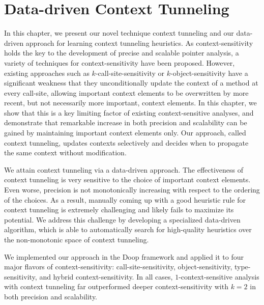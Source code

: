 \chapter{Data-driven Context Tunneling}\label{sec:Tunneling}
  In this chapter, we present our novel technique context tunneling and our data-driven approach for learning context tunneling heuristics.
  As context-sensitivity holds the key to the development
  of precise and scalable pointer analysis, a variety of techniques
  for context-sensitivity have been proposed. However, existing
  approaches such as $k$-call-site-sensitivity or $k$-object-sensitivity have a
  significant weakness that they unconditionally update the context of a
  method at every call-site, allowing important context elements to be
  overwritten by more recent, but not necessarily more important,
  context elements. In this chapter, we show that this is a key limiting factor of
  existing context-sensitive analyses, and demonstrate that remarkable increase in
  both precision and scalability can be gained by
  maintaining important context elements only.
  Our approach, called context tunneling, updates contexts selectively
  and decides when to propagate the same context without
  modification.



  We attain context tunneling via a data-driven approach.  The
  effectiveness of context tunneling is very sensitive to the choice
  of important context elements. Even worse, precision is not
  monotonically increasing with respect to the ordering of the
  choices. As a result, manually coming up with a good heuristic rule
  for context tunneling is extremely challenging and likely fails to
  maximize its potential. We address this challenge by developing a
  specialized data-driven algorithm, which is able to automatically
  search for high-quality heuristics over the non-monotonic space of
  context tunneling.

  We implemented our approach in the Doop framework and applied it to
  four major flavors of context-sensitivity: call-site-sensitivity,
  object-sensitivity, type-sensitivity, and hybrid context-sensitivity. In
  all cases, $1$-context-sensitive analysis with context
  tunneling far outperformed deeper context-sensitivity with $k=2$ in
  both precision and scalability.






